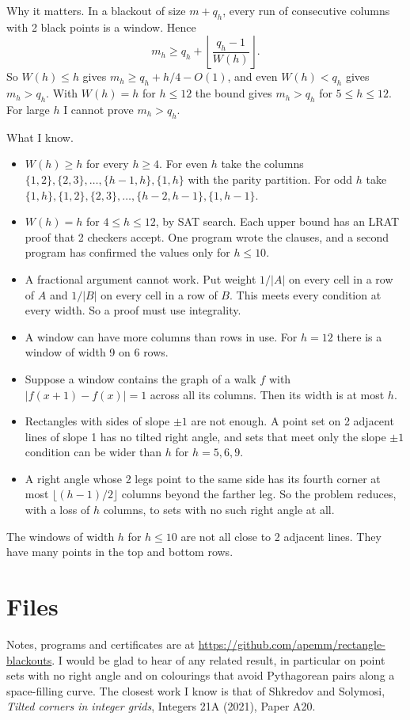 \documentclass[10pt]{article}
\begin{document}
Why it matters. In a blackout of size $m+q_h$, every run of consecutive columns with 2 black
points is a window. Hence
\[
 m_h\ge q_h+\left\lfloor\frac{q_h-1}{W(h)}\right\rfloor .
\]
So $W(h)\le h$ gives $m_h\ge q_h+h/4-O(1)$, and even $W(h)<q_h$ gives $m_h>q_h$. With $W(h)=h$
for $h\le12$ the bound gives $m_h>q_h$ for $5\le h\le12$. For large $h$ I cannot prove $m_h>q_h$.

What I know.
\begin{itemize}
\item $W(h)\ge h$ for every $h\ge4$. For even $h$ take the columns
$\{1,2\},\{2,3\},\dots,\{h-1,h\},\{1,h\}$ with the parity partition. For odd $h$ take
$\{1,h\},\{1,2\},\{2,3\},\dots,\{h-2,h-1\},\{1,h-1\}$.
\item $W(h)=h$ for $4\le h\le12$, by SAT search. Each upper bound has an LRAT proof that 2 checkers accept. One program wrote the clauses, and a second program has confirmed the values only for $h\le10$.
\item A fractional argument cannot work. Put weight $1/|A|$ on every cell in a row of $A$ and $1/|B|$ on every cell in a row of $B$. This meets every condition at every width. So a proof must use integrality.
\item A window can have more columns than rows in use. For $h=12$ there is a window of width 9 on 6 rows.
\item Suppose a window contains the graph of a walk $f$ with $|f(x+1)-f(x)|=1$ across all its
columns. Then its width is at most $h$.
\item Rectangles with sides of slope $\pm1$ are not enough. A point set on 2 adjacent lines of
slope 1 has no tilted right angle, and sets that meet only the slope $\pm1$ condition can be
wider than $h$ for $h=5,6,9$.
\item A right angle whose 2 legs point to the same side has its fourth corner at most
$\lfloor(h-1)/2\rfloor$ columns beyond the farther leg. So the problem reduces, with a loss of
$h$ columns, to sets with no such right angle at all.
\end{itemize}

The windows of width $h$ for $h\le10$ are not all close to 2 adjacent lines. They have many
points in the top and bottom rows.

\section*{Files}

Notes, programs and certificates are at
\url{https://github.com/apemm/rectangle-blackouts}. I would be glad to hear of any related
result, in particular on point sets with no right angle and on colourings that avoid Pythagorean
pairs along a space-filling curve. The closest work I know is that of Shkredov and Solymosi,
\emph{Tilted corners in integer grids}, Integers 21A (2021), Paper A20.
\end{document}
